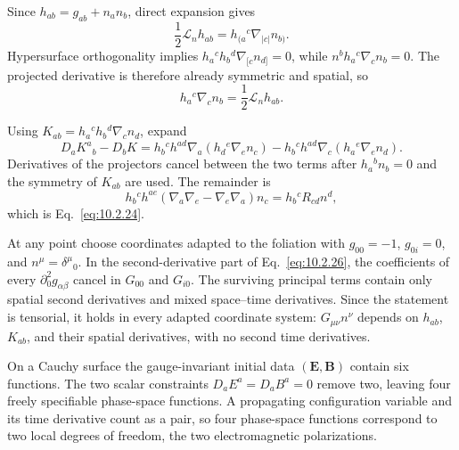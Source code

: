 \begin{enumerate}[leftmargin=2.8em,itemsep=1.2em]
Since \(h_{ab}=g_{ab}+n_an_b\), direct expansion gives
\[
 \frac12\mathcal L_nh_{ab}
 =h_{(a}{}^c\nabla_{|c|}n_{b)}.
\]
Hypersurface orthogonality implies
\(h_a{}^ch_b{}^d\nabla_{[c}n_{d]}=0\), while
\(n^b h_a{}^c\nabla_cn_b=0\).  The projected derivative is therefore
already symmetric and spatial, so
\[
 h_a{}^c\nabla_cn_b=\frac12\mathcal L_nh_{ab}.
\]

Using \(K_{ab}=h_a{}^ch_b{}^d\nabla_cn_d\), expand
\[
 D_aK^a{}_b-D_bK
 =h_b{}^c h^{ad}\nabla_a(h_d{}^e\nabla_en_c)
 -h_b{}^c h^{ad}\nabla_c(h_a{}^e\nabla_en_d).
\]
Derivatives of the projectors cancel between the two terms after
\(h_a{}^bn_b=0\) and the symmetry of \(K_{ab}\) are used.  The remainder is
\[
 h_b{}^ch^{ae}(\nabla_a\nabla_e-
 \nabla_e\nabla_a)n_c
 =h_b{}^cR_{cd}n^d,
\]
which is Eq.~\eqref{eq:10.2.24}.

At any point choose coordinates adapted to the foliation with
\(g_{00}=-1\), \(g_{0i}=0\), and \(n^\mu=\delta^\mu{}_0\).  In the
second-derivative part of Eq.~\eqref{eq:10.2.26}, the coefficients of every
\(\partial_0^2g_{\alpha\beta}\) cancel in \(G_{00}\) and \(G_{i0}\).
The surviving principal terms contain only spatial second derivatives and
mixed space--time derivatives.  Since the statement is tensorial, it holds in
every adapted coordinate system: \(G_{\mu\nu}n^\nu\) depends on \(h_{ab}\),
\(K_{ab}\), and their spatial derivatives, with no second time derivatives.

On a Cauchy surface the gauge-invariant initial data \((\mathbf E,\mathbf B)\)
contain six functions.  The two scalar constraints
\(D_aE^a=D_aB^a=0\) remove two, leaving four freely specifiable phase-space
functions.  A propagating configuration variable and its time derivative
count as a pair, so four phase-space functions correspond to two local
degrees of freedom, the two electromagnetic polarizations.
\end{enumerate}
